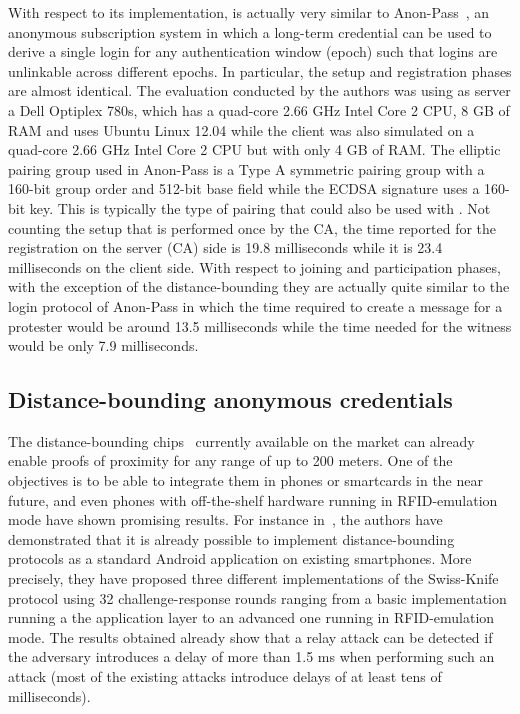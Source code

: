 With respect to its implementation, \CROCUS is actually very similar to Anon-Pass~\cite{AnonPass}, an anonymous subscription system in which a long-term credential can be used to derive a single login for any authentication window (\ie epoch) such that logins are unlinkable across different epochs. 
In particular, the setup and registration phases are almost identical. 
The evaluation conducted by the authors was using as server a Dell Optiplex 780s, which has a quad-core 2.66 GHz Intel Core 2 CPU, 8 GB of RAM and uses Ubuntu Linux 12.04 while the client was also simulated on a quad-core 2.66 GHz Intel Core 2 CPU but with only 4 GB of RAM.
The elliptic pairing group used in Anon-Pass is a Type A symmetric pairing group with a 160-bit group order and 512-bit base field while the ECDSA signature uses a 160-bit key.
This is typically the type of pairing that could also be used with \CROCUS.
Not counting the setup that is performed once by the CA, the time reported for the registration on the server (\ie CA) side is 19.8 milliseconds while it is 23.4 milliseconds on the client side.
With respect to joining and participation phases, with the exception of the distance-bounding they are actually quite similar to the login protocol of Anon-Pass in which the time required to create a message for a protester would be around 13.5 milliseconds while the time needed for the witness would be only 7.9 milliseconds.

\subsection{Distance-bounding anonymous credentials}
The distance-bounding chips~\cite{3dB-access} currently available on the market 
can already enable proofs of proximity for any range of up to 
  200 meters.
One of the objectives is to be able to integrate them in phones or smartcards in the near future, and even phones with off-the-shelf hardware running in RFID-emulation mode have shown promising results.
For instance in~\cite{DBonSmartphones}, the authors have demonstrated that it is already possible to implement distance-bounding protocols as a standard Android application on existing smartphones. 
More precisely, they have proposed three different implementations of the Swiss-Knife protocol using 32 challenge-response rounds ranging from a basic implementation running a the application layer to an advanced one running in RFID-emulation mode. 
The results obtained already show that a relay attack can be detected if the adversary introduces a delay of more than 1.5 ms when performing such an attack (most of the existing attacks introduce delays of at least tens of milliseconds).

